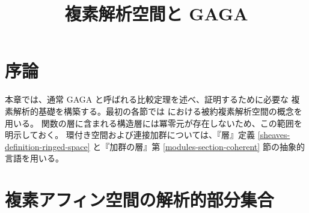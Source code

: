 
\def\GAGACJKMainFont{Yu Gothic}


\renewcommand{\contentsname}{目次}
\renewcommand{\refname}{参考文献}
\renewcommand{\proofname}{証明}

\let\theorem\relax
\let\endtheorem\relax
\let\proposition\relax
\let\endproposition\relax
\let\lemma\relax
\let\endlemma\relax
\let\definition\relax
\let\enddefinition\relax
\let\remark\relax
\let\endremark\relax
\theoremstyle{plain}
\newtheorem{theorem}[subsection]{定理}
\newtheorem{proposition}[subsection]{命題}
\newtheorem{lemma}[subsection]{補題}
\theoremstyle{definition}
\newtheorem{definition}[subsection]{定義}
\theoremstyle{remark}
\newtheorem{remark}[subsection]{注意}

%


\raggedbottom

\title{複素解析空間と GAGA}

\maketitle

\label{section-phantom}

\tableofcontents

\section{序論}
\label{section-introduction}

\noindent
本章では、通常 GAGA と呼ばれる比較定理を述べ、証明するために必要な
複素解析的基礎を構築する。最初の各節では
\cite[\S 1、第1--4項、3--7頁]{GAGA} における被約複素解析空間の概念を用いる。
関数の層に含まれる構造層には冪零元が存在しないため、この範囲を明示しておく。
環付き空間および連接加群については、『層』定義
\ref{sheaves-definition-ringed-space} と『加群の層』第
\ref{modules-section-coherent} 節の抽象的言語を用いる。

\section{複素アフィン空間の解析的部分集合}
\label{section-analytic-subsets}

